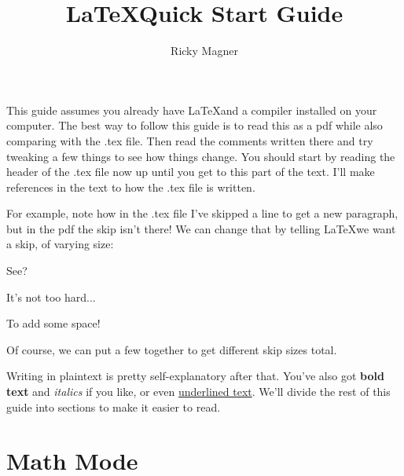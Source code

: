 \documentclass[12pt]{article}
\title{\LaTeX Quick Start Guide}
\author{Ricky Magner}
\date{}
\begin{document}
	
	\maketitle
	
	This guide assumes you already have \LaTeX and a compiler installed on your computer. The best way to follow this guide is to read this as a pdf while also comparing with the .tex file. Then read the comments written there and try tweaking a few things to see how things change. You should start by reading the header of the .tex file now up until you get to this part of the text. I'll make references in the text to how the .tex file is written. 
	
	For example, note how in the .tex file I've skipped a line to get a new paragraph, but in the pdf the skip isn't there! We can change that by telling \LaTeX we want a skip, of varying size:
	
	\smallskip
	
	See?
	
	\medskip
	
	It's not too hard...
	
	\bigskip
	
	To add some space!
	
	\bigskip
	\bigskip
	
	Of course, we can put a few together to get different skip sizes total.
	
	\medskip
	
	Writing in plaintext is pretty self-explanatory after that. You've also got \textbf{bold text} and \textit{italics} if you like, or even \underline{underlined text}. We'll divide the rest of this guide into sections to make it easier to read.
	
	\section{Math Mode}
	
\end{document}
